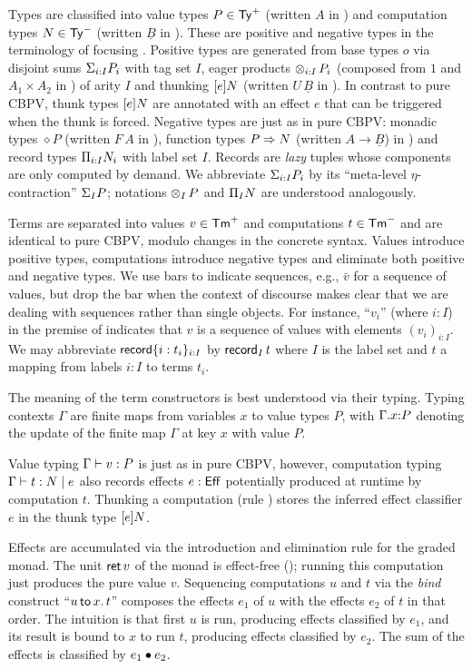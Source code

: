 \documentclass[acmsmall,review,anonymous]{acmart}\settopmatter{printfolios=true,printccs=false,printacmref=false}
\theoremstyle{remark}
\begin{document}
Types are classified into value types $P \in \PTy$ (written $A$ in
\citet{levy:hosc06}) and computation types $N \in \NTy$
(written $\underline B$ in
\loccit).  These are positive and negative types in the terminology of
focusing \cite{zeilberger:PhD}.
Positive types are generated from base types $o$ via
disjoint sums $\sumty i I P$ with tag set $I$,
eager products $\tupty i I P$
(composed from $1$ and $A_1 \times A_2$ in \loccit)
of arity $I$
and thunking $\thunkty e N$
(written $U\,\underline B$ in \loccit).  In contrast to pure CBPV,
thunk types $\thunkty e N$ are annotated with an effect $e$ that can
be triggered when the thunk is forced.  Negative types are just as in
pure CBPV: monadic types $\diamond P$ (written $F\,A$ in \loccit),
function types $P \To N$ (written $A \to \underline B$) in \loccit)
and record types $\recty i I N$ with label set $I$.
Records are \emph{lazy} tuples whose components are only computed by demand.
We abbreviate $\sumty i I P$ by its ``meta-level $\eta$-contraction''
$\sumt I P$; notations $\tupt I P$ and
$\rect I N$ are understood analogously.

Terms are separated into values $v \in \PTm$ and computations $t \in
\NTm$ and are identical to pure CBPV, modulo changes in the concrete
syntax.  Values introduce positive types,
computations introduce
negative types and
eliminate both positive and negative types.
We use bars to indicate sequences, e.g., $\bar v$ for a
sequence of values, but drop the bar when the context of discourse
makes clear that we are dealing with sequences rather than single
objects.  For instance, ``$v_i$'' (where $i : I$) in the premise of
\rintro\otimes indicates that $v$ is a sequence of values with
elements $(v_i)_{i:I}$.  We may abbreviate $\trecord \{i :
t_i\}_{i:I}$ by $\recrd I t$ where $I$ is the label set and $t$ a
mapping from labels $i:I$ to terms $t_i$.

The meaning of the term constructors is best understood via their
typing.  Typing contexts $\Gamma$ are finite maps from variables $x$
to value types $P$, with $\ext \Gamma x P$ denoting the update of the
finite map $\Gamma$ at key $x$ with value $P$.

Value typing $\ValTy \Gamma v P$ is just as in pure CBPV, however,
computation typing $\CompTy \Gamma t e N$ also records effects $e :
\Eff$ potentially produced at runtime by computation $t$.  Thunking a
computation (rule \rintro\Box) stores the inferred effect classifier
$e$ in the thunk type $\thunkty e N$.

Effects are accumulated via the introduction and elimination rule for
the graded monad.  The unit $\ret v$ of the monad is effect-free
(\rintro\diamond); running this computation just produces the pure
value $v$.  Sequencing computations $u$ and $t$ via the \emph{bind}
construct ``$\bind x u t$'' composes the effects $e_1$ of $u$ with the
effects $e_2$ of $t$ in that order.  The intuition is that first $u$
is run, producing effects classified by $e_1$, and its result is bound
to $x$ to run $t$, producing effects classified by $e_2$.  The sum of
the effects is classified by $e_1 \bu e_2$.
\end{document}
